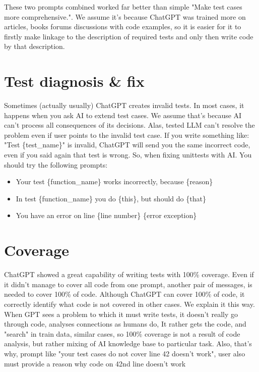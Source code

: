 \documentclass[12pt]{report}
\begin{document}
		These two prompts combined worked far better than simple "Make test cases more comprehensive.". 
We assume it's because ChatGPT was trained more on articles, books forums discussions with code examples, so it is easier for it  to firstly make linkage to the description of required tests and only then write code by that description.
		
	
	\section{Test diagnosis \& fix}
		
		Sometimes (actually usually) ChatGPT creates invalid tests. In most cases, it happens when you ask AI to 
extend test cases. We assume that's because AI can't process all consequences of its decisions.
Alas, tested LLM can't resolve the problem even if user points to the invalid test case. 
If you write something like: "Test \{test\_name\}" is invalid, ChatGPT will send you the same incorrect code, even if 
you said again that test is wrong. So, when fixing unittests with AI. You should try the following prompts:
		
		\begin{itemize}
			\item Your test \{function\_name\} works incorrectly, because \{reason\}
			\item In test \{function\_name\} you do \{this\}, but should do \{that\}
			\item You have an error on line \{line number\} \{error exception\}
		\end{itemize}
		
	\section{Coverage}
	
	ChatGPT showed a great capability of writing tests with 100\% coverage. Even if it didn't manage to cover all code from 
one prompt, another pair of messages, is needed to cover 100\% of code. Although ChatGPT can cover 100\% of code, it 
correctly identify what code is not covered in other cases. We explain it this way. When GPT sees a problem to which 
it must write tests, it doesn't really go through code, analyses connections as humans do, It rather gets the code,
and "search" in train data, similar cases, so 100\% coverage is not a result of code analysis, but rather mixing of
AI knowledge base to particular task. Also, that's why, prompt like "your test cases do not cover line 42 doesn't work",
user also must provide a reason why code on 42nd line doesn't work
\end{document}
